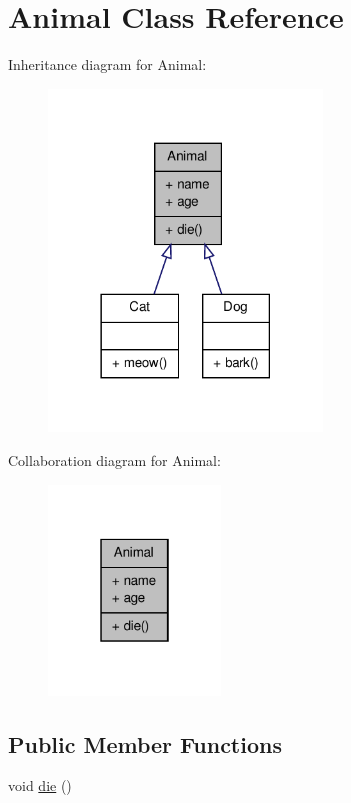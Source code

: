 \hypertarget{classAnimal}{\section{Animal Class Reference}
\label{classAnimal}
}


Inheritance diagram for Animal\-:
\nopagebreak
\begin{figure}[H]
\begin{center}
\leavevmode
\includegraphics[width=206pt]{classAnimal__inherit__graph}
\end{center}
\end{figure}


Collaboration diagram for Animal\-:
\nopagebreak
\begin{figure}[H]
\begin{center}
\leavevmode
\includegraphics[width=130pt]{classAnimal__coll__graph}
\end{center}
\end{figure}
\subsection*{Public Member Functions}
\begin{DoxyCompactItemize}
\item 
void \hyperlink{classAnimal_a557fe0d71dda75be2f8459ce0d7c2275}{die} ()
\end{DoxyCompactItemize}
